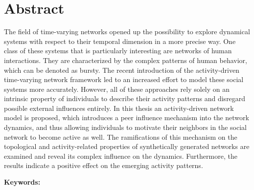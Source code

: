 \chapter*{Abstract}
\label{cha:abstract}

The field of time-varying networks opened up the possibility to explore dynamical systems with respect to their temporal dimension in a more precise way.
One class of these systems that is particularly interesting are networks of human interactions.
They are characterized by the complex patterns of human behavior, which can be denoted as bursty.
The recent introduction of the activity-driven time-varying network framework led to an increased effort to model these social systems more accurately.
However, all of these approaches rely solely on an intrinsic property of individuals to describe their activity patterns and disregard possible external influences entirely.
In this thesis an activity-driven network model is proposed, which introduces a peer influence mechanism into the network dynamics, and thus allowing individuals to motivate their neighbors in the social network to become active as well.
The ramifications of this mechanism on the topological and activity-related properties of synthetically generated networks are examined and reveal its complex influence on the dynamics.
Furthermore, the results indicate a positive effect on the emerging activity patterns.


\textbf{Keywords:} \mykeywords
